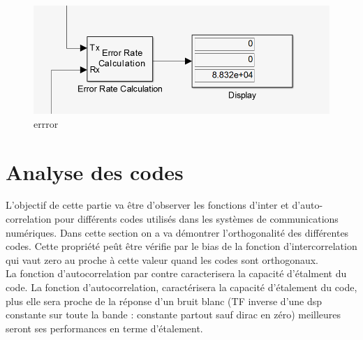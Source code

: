 \documentclass{report}
\begin{document}
\begin{figure}[h]
	\centering
	\includegraphics[width=0.7\linewidth]{error_q1}
	\caption{errror}
	\label{fig:errorq1}
\end{figure}




\newpage
\section{Analyse des codes}%
L'objectif de cette partie va être d'observer les fonctions d'inter et d'auto-correlation pour
différents codes utilisés dans les systèmes de communications numériques.
Dans cette section on a va démontrer l'orthogonalité des différentes codes. Cette propriété peût être vérifie par
le bias de la fonction d'intercorrelation qui vaut zero au proche à cette valeur quand les codes sont orthogonaux.\\
La fonction d'autocorrelation par contre caracterisera la capacité d'étalment du code.
La fonction d'autocorrelation, caractérisera la capacité d'étalement du code, plus elle
sera proche de la réponse d'un bruit blanc (TF inverse d'une dsp constante sur toute la
bande : constante partout sauf dirac en zéro) meilleures seront ses performances en
terme d'étalement.
\end{document}
